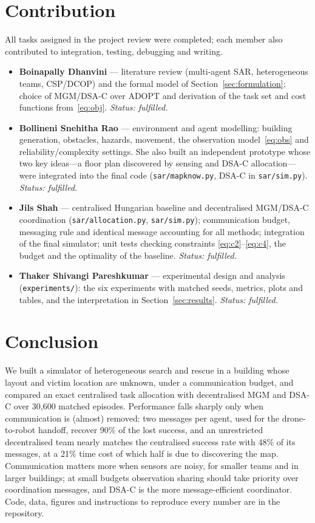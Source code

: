 \documentclass{article}
\begin{document}
\section{Contribution}\label{sec:contrib}
All tasks assigned in the project review were completed; each member also contributed to integration, testing,
debugging and writing.
\begin{itemize}\setlength\itemsep{0pt}
\item \textbf{Boinapally Dhanvini} --- literature review (multi-agent SAR, heterogeneous teams, CSP/DCOP) and the formal
model of Section~\ref{sec:formulation}; choice of MGM/DSA-C over ADOPT and derivation of the task set and cost functions
from~\eqref{eq:obj}. \emph{Status: fulfilled.}
\item \textbf{Bollineni Snehitha Rao} --- environment and agent modelling: building generation, obstacles, hazards,
movement, the observation model~\eqref{eq:obs} and reliability/complexity settings. She also built an independent
prototype whose two key ideas---a floor plan discovered by sensing and DSA-C allocation---were integrated into the final
code (\texttt{sar/mapknow.py}, DSA-C in \texttt{sar/sim.py}). \emph{Status: fulfilled.}
\item \textbf{Jils Shah} --- centralised Hungarian baseline and decentralised MGM/DSA-C coordination
(\texttt{sar/allocation.py}, \texttt{sar/sim.py}); communication budget, messaging rule and identical message accounting
for all methods; integration of the final simulator; unit tests checking constraints \eqref{eq:c2}--\eqref{eq:c4}, the
budget and the optimality of the baseline. \emph{Status: fulfilled.}
\item \textbf{Thaker Shivangi Pareshkumar} --- experimental design and analysis (\texttt{experiments/}): the six
experiments with matched seeds, metrics, plots and tables, and the interpretation in Section~\ref{sec:results}.
\emph{Status: fulfilled.}
\end{itemize}

\section{Conclusion}
We built a simulator of heterogeneous search and rescue in a building whose layout and victim location are unknown,
under a communication budget, and compared an exact centralised task allocation with decentralised MGM and DSA-C over
30{,}600 matched episodes. Performance falls sharply only when communication is (almost) removed: two messages per
agent, used for the drone-to-robot handoff, recover 90\% of the lost success, and an unrestricted decentralised team
nearly matches the centralised success rate with 48\% of its messages, at a 21\% time cost of which half is due to discovering
the map. Communication matters more when sensors are noisy, for smaller teams and in larger buildings; at small budgets
observation sharing should take priority over coordination messages, and DSA-C is the more message-efficient
coordinator. Code, data, figures and instructions to reproduce every number are in the repository.
\end{document}
